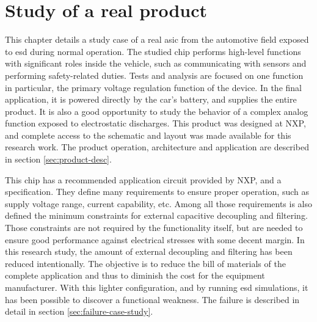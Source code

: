 \section{Study of a real product}
\label{sec:study-real-product}

This chapter details a study case of a real \gls{asic} from the automotive field exposed to \gls{esd} during normal operation.
The studied chip performs high-level functions with significant roles inside the vehicle, such as communicating with sensors and performing safety-related duties.
Tests and analysis are focused on one function in particular, the primary voltage regulation function of the device.
In the final application, it is powered directly by the car's battery, and supplies the entire product.
It is also a good opportunity to study the behavior of a complex analog function exposed to electrostatic discharges.
This product was designed at NXP, and complete access to the schematic and layout was made available for this research work.
The product operation, architecture and application are described in section \ref{sec:product-desc}.

This chip has a recommended application circuit provided by NXP, and a specification.
They define many requirements to ensure proper operation, such as supply voltage range, current capability, etc.
Among all those requirements is also defined the minimum constraints for external capacitive decoupling and filtering.
Those constraints are not required by the functionality itself, but are needed to ensure good performance against electrical stresses with some decent margin.
In this research study, the amount of external decoupling and filtering has been reduced intentionally.
The objective is to reduce the bill of materials of the complete application and thus to diminish the cost for the equipment manufacturer.
With this lighter configuration, and by running \gls{esd} simulations, it has been possible to discover a functional weakness.
The failure is described in detail in section \ref{sec:failure-case-study}.



